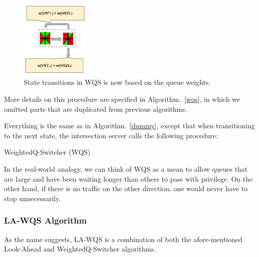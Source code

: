 \documentclass[conference]{IEEEtran}
\begin{document}
\begin{figure}[h]
    \center    
    \includegraphics[width=0.3\textwidth]{images/wqs_decision.png}
	\caption{State transitions in WQS is now based on the queue weights.}
	\label{wqs_decision}
\end{figure}

More details on this procedure are specified in Algorithm.~\ref{wqs}, in which we omitted parts that are duplicated from previous algorithms.

\begin{algorithm}
  Everything is the same as in Algorithm.~\ref{dummy}, except that when transitioning to the next state, the intersection server calls the following procedure:
  
 
 
  \caption{WeightedQ-Switcher (WQS) \label{wqs}}
\end{algorithm}

In the real-world analogy, we can think of WQS as a mean to allow queues that are large and have been waiting longer than others to pass with privilege. On the other hand, if there is no traffic on the other direction, one would never have to stop unnecessarily.


\subsubsection{ LA-WQS Algorithm}
As the name suggests, LA-WQS is a combination of both the afore-mentioned Look-Ahead and WeightedQ-Switcher algorithms.
\end{document}
